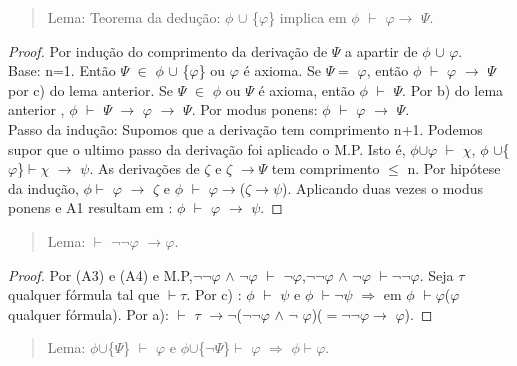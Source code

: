 \documentclass[12pt]{report}
\begin{document}
	
\begin{quote} 
Lema: Teorema da dedução: $\phi$ $\cup$ \{$\varphi$\} implica em $\phi$ $\vdash$ $\varphi$$\rightarrow$ $\Psi$.\end{quote}
\begin{proof} Por indução do comprimento da derivação de $\Psi$ a apartir de $\phi$ $\cup$ $\varphi$.\\
Base: n=1. Então $\Psi$ $\in$ $\phi$ $\cup$ \{$\varphi$\} ou $\varphi$ é axioma. Se $\Psi$$=$ $\varphi$, então $\phi$ $\vdash$ $\varphi$ $\rightarrow$ $\Psi$ por c) do lema anterior. Se $\Psi$ $\in$ $\phi$ ou $\Psi$ é axioma, então $\phi$ $\vdash$ $\Psi$. Por  b) do lema anterior , $\phi$ $\vdash$ $\Psi$ $\rightarrow$ $\varphi$ $\rightarrow$ $\Psi$. Por modus ponens: $\phi$ $\vdash$ $\varphi$ $\rightarrow$ $\Psi$.\\
Passo da indução: Supomos que a derivação tem comprimento n+1. Podemos supor que o ultimo passo da derivação foi aplicado o M.P. Isto é, $\phi$$\cup$$\varphi$ $\vdash$ $\chi$, $\phi$ $\cup$\{$\varphi$\}$\vdash$$\chi$ $\rightarrow$ $\psi$. As derivações de $\zeta$ e $\zeta$ $\rightarrow$$\Psi$ tem comprimento $\leq$ n. Por hipótese da indução, $\phi$$\vdash$ $\varphi$ $\rightarrow$ $\zeta$ e $\phi$ $\vdash$ $\varphi$$\rightarrow$($\zeta$$\rightarrow$$\psi$). Aplicando duas vezes o modus ponens e A1 resultam em : $\phi$ $\vdash$ $\varphi$ $\rightarrow$ $\psi$.\end{proof}
\begin{quote} Lema: $\vdash$ $\neg$$\neg$$\varphi$ $\rightarrow$$\varphi$.\end{quote}
\begin{proof} Por (A3) e (A4) e M.P,$\neg$$\neg$$\varphi$ $\land$ $\neg$$\varphi$ $\vdash$ $\neg$$\varphi$,$\neg$$\neg$$\varphi$ $\land$ $\neg$$\varphi$ $\vdash$$\neg$$\neg$$\varphi$. Seja $\tau$ qualquer fórmula tal que $\vdash$$\tau$. Por c) : $\phi$ $\vdash$ $\psi$ e $\phi$ $\vdash$$\neg$$\psi$ $\Longrightarrow$ em $\phi$ $\vdash$$\varphi$($\varphi$ qualquer fórmula). Por a): $\vdash$ $\tau$ $\rightarrow$$\neg$($\neg$$\neg$$\varphi$ $\land$ $\neg$ $\varphi$)($=$$\neg$$\neg$$\varphi$$\rightarrow$ $\varphi$).\end{proof}
\begin{quote} Lema: $\phi$$\cup$\{$\Psi$\} $\vdash$ $\varphi$ e $\phi$$\cup$\{$\neg$$\Psi$\}$\vdash$ $\varphi$ $\Longrightarrow$ $\phi$$\vdash$$\varphi$.\end{quote}
\end{document}
